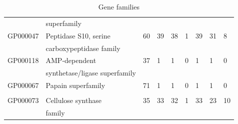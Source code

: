 \documentclass[10pt,letterpaper]{article}
\begin{document}
\begin{table}[]
\begin{tabular}{lllllllll}
              & superfamily & & & & & & & \\
GP000047      & Peptidase S10, serine  & 60                                  & 39                                        & 38   & 1     & 39                                              & 31   & 8     \\
	      & carboxypeptidase family & & & & & & & \\
GP000118      & AMP-dependent    & 37                                  & 1                                         & 1    & 0     & 1                                               & 1    & 0     \\
	      & synthetase/ligase superfamily  & & & & & & & \\
GP000067      & Papain superfamily                            & 71                                  & 1                                         & 1    & 0     & 1                                               & 1    & 0     \\
	      & & & & & & & & \\
GP000073      & Cellulose synthase                      & 35                                  & 33                                        & 32   & 1     & 33                                              & 23   & 10    \\
	      & family & & & & & & &
\end{tabular}
\caption{Gene families}
\label{GF}
\end{table}
  
\end{document}
